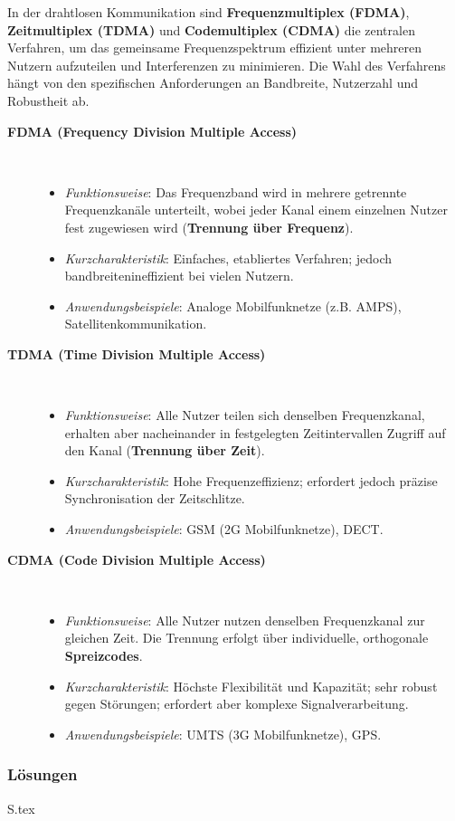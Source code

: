 \documentclass[10pt,a4paper,ngerman]{article}
\theoremstyle{definition}
\theoremstyle{plain}
\theoremstyle{mytheorem}
\theoremstyle{definition}
\newenvironment{ohmchapter}{}
{
  \subsubsection*{Lösungen}
  S\arabic{subsection}.tex}
}
\begin{document}
\begin{ohmchapter}
In der drahtlosen Kommunikation sind \textbf{Frequenzmultiplex (FDMA)}, \textbf{Zeitmultiplex (TDMA)} und \textbf{Codemultiplex (CDMA)} die zentralen Verfahren, um das gemeinsame Frequenzspektrum effizient unter mehreren Nutzern aufzuteilen und Interferenzen zu minimieren. Die Wahl des Verfahrens hängt von den spezifischen Anforderungen an Bandbreite, Nutzerzahl und Robustheit ab.

\begin{description} 
    \item[\textbf{FDMA (Frequency Division Multiple Access)}]
     \ \\
    \begin{itemize}
        \item  \textit{Funktionsweise}: Das Frequenzband wird in mehrere getrennte Frequenzkanäle unterteilt, wobei jeder Kanal einem einzelnen Nutzer fest zugewiesen wird (\textbf{Trennung über Frequenz}).
        \item \textit{Kurzcharakteristik}: Einfaches, etabliertes Verfahren; jedoch bandbreitenineffizient bei vielen Nutzern.
        \item \textit{Anwendungsbeispiele}: Analoge Mobilfunknetze (z.B. AMPS), Satellitenkommunikation.
    \end{itemize}

    \item[\textbf{TDMA (Time Division Multiple Access)}]
    \ \\
    \begin{itemize}
        \item \textit{Funktionsweise}: Alle Nutzer teilen sich denselben Frequenzkanal, erhalten aber nacheinander in festgelegten Zeitintervallen Zugriff auf den Kanal (\textbf{Trennung über Zeit}).
        \item \textit{Kurzcharakteristik}: Hohe Frequenzeffizienz; erfordert jedoch präzise Synchronisation der Zeitschlitze.
        \item \textit{Anwendungsbeispiele}: GSM (2G Mobilfunknetze), DECT.
    \end{itemize}

    \item[\textbf{CDMA (Code Division Multiple Access)}]
    \ \\
    \begin{itemize}
        \item \textit{Funktionsweise}: Alle Nutzer nutzen denselben Frequenzkanal zur gleichen Zeit. Die Trennung erfolgt über individuelle, orthogonale \textbf{Spreizcodes}.
        \item \textit{Kurzcharakteristik}: Höchste Flexibilität und Kapazität; sehr robust gegen Störungen; erfordert aber komplexe Signalverarbeitung.
        \item \textit{Anwendungsbeispiele}: UMTS (3G Mobilfunknetze), GPS.
    \end{itemize}
\end{description}


\end{ohmchapter}
\end{document}
